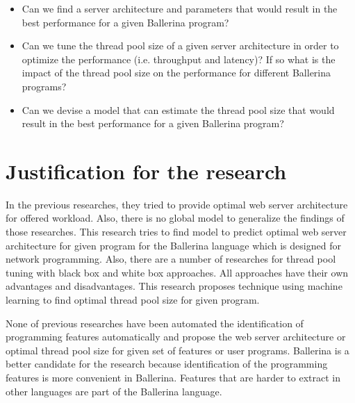\begin{itemize}
	
 	
 	\item Can we find a server architecture and parameters that would result in the best performance for a given Ballerina program? 
 	\item Can we tune the thread pool size of a given server architecture in order to optimize the performance (i.e. throughput and latency)? If so what is the impact of the thread pool size on the performance for different Ballerina programs? 
 	\item Can we devise a model that can estimate the thread pool size that would result in the best performance for a given Ballerina program?
\end{itemize}




\section{Justification for the research}

 In the previous researches, they tried to provide optimal web server architecture for offered workload. Also, there is no global model to generalize the findings of those researches. This research tries to find model to predict optimal web server architecture for given program for the Ballerina language which is designed for network programming.  Also, there are a number of researches for thread pool tuning with black box and white box approaches. All approaches have their own advantages and disadvantages. This research proposes technique using machine learning to find optimal thread pool size for given program.  
 
 None of previous researches have been automated the identification of programming features automatically and propose the web server architecture or optimal thread pool size for given set of features or user programs. Ballerina is a better candidate for the research because identification of the programming features is more convenient in Ballerina. Features that are harder to extract in other languages are part of the Ballerina language.  


